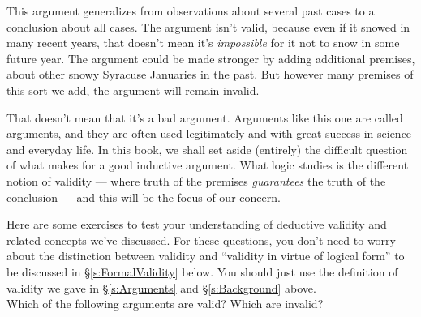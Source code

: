 This argument generalizes from observations about several past cases to a conclusion about all cases. The argument isn't valid, because even if it snowed in many recent years, that doesn't mean it's \emph{impossible} for it not to snow in some future year.  The argument could be made stronger by adding additional premises, about other snowy Syracuse Januaries in the past. But however many premises of this sort we add, the argument will remain invalid.

That doesn't mean that it's a bad argument.  Arguments like this one are called  arguments, and they are often used legitimately and with great success in science and everyday life.  In this book, we shall set aside (entirely) the difficult question of what makes for a good inductive argument.  What logic studies is the different notion of  validity --- where truth of the premises \emph{guarantees} the truth of the conclusion --- and this will be the focus of our concern.

\practiceproblems

Here are some exercises to test your understanding of deductive validity and related concepts we've discussed.  For these questions, you don't need to worry about the distinction between validity and ``validity in virtue of logical form'' to be discussed in \S\ref{s:FormalValidity}  below.  You should just use the definition of validity we gave in \S\ref{s:Arguments} and \S \ref{s:Background} above.\\


\problempart  Which of the following arguments are valid? Which are invalid?

